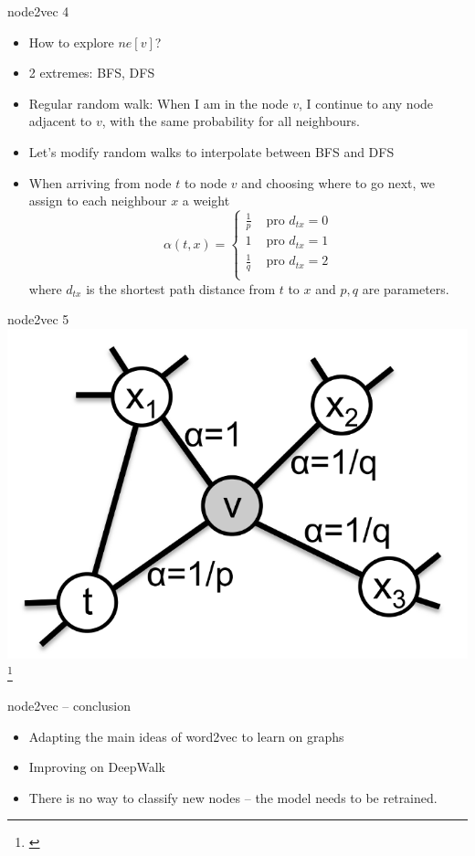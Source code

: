 \documentclass[10pt]{beamer}
\begin{document}
\begin{frame}{node2vec 4}
	\begin{itemize}
		\item How to explore \( ne \left[ v \right] \)?
		\item 2 extremes: BFS, DFS
		\item Regular random walk: When I am in the node \( v \), I continue to any node adjacent to \( v \), with the same probability for all neighbours.
		\item Let's modify random walks to interpolate between BFS and DFS
		\item When arriving from node \( t \) to node \( v \) and choosing where to go next, we assign to each neighbour \( x \) a weight
			\[ \alpha \left( t, x \right) = \begin{cases}
				\frac{1}{p} &\text{ pro } d_{tx} = 0 \\
				1 &\text{ pro } d_{tx} = 1 \\
				\frac{1}{q} &\text{ pro } d_{tx} = 2 \\
			\end{cases} \]
			where \( d_{tx} \) is the shortest path distance from \( t \) to \( x \) and \( p, q \) are parameters.
	\end{itemize}
\end{frame}

\begin{frame}{node2vec 5}
	\centering
	\includegraphics[width=0.7\pagewidth]{images/node2vec-alpha.png}\footnote{\cite{grover_node2vec_2016}}
\end{frame}

\begin{frame}{node2vec -- conclusion}
	\begin{itemize}
		\item Adapting the main ideas of word2vec to learn on graphs
		\item Improving on DeepWalk
		\item There is no way to classify new nodes -- the model needs to be retrained.
	\end{itemize}
\end{frame}
\end{document}
